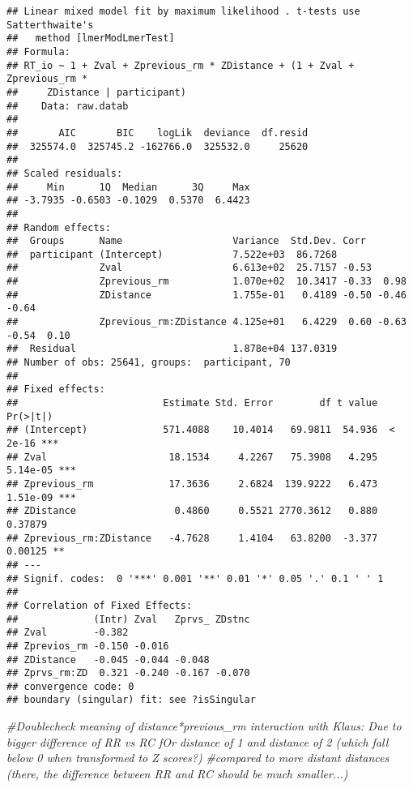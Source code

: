 \documentclass[
]{article}
\newenvironment{Shaded}{\begin{snugshade}}{\end{snugshade}}
\newcommand{\CommentTok}[1]{\textcolor[rgb]{0.56,0.35,0.01}{\textit{#1}}}
\begin{document}
\begin{verbatim}
## Linear mixed model fit by maximum likelihood . t-tests use Satterthwaite's
##   method [lmerModLmerTest]
## Formula: 
## RT_io ~ 1 + Zval + Zprevious_rm * ZDistance + (1 + Zval + Zprevious_rm *  
##     ZDistance | participant)
##    Data: raw.datab
## 
##       AIC       BIC    logLik  deviance  df.resid 
##  325574.0  325745.2 -162766.0  325532.0     25620 
## 
## Scaled residuals: 
##     Min      1Q  Median      3Q     Max 
## -3.7935 -0.6503 -0.1029  0.5370  6.4423 
## 
## Random effects:
##  Groups      Name                   Variance  Std.Dev. Corr                   
##  participant (Intercept)            7.522e+03  86.7268                        
##              Zval                   6.613e+02  25.7157 -0.53                  
##              Zprevious_rm           1.070e+02  10.3417 -0.33  0.98            
##              ZDistance              1.755e-01   0.4189 -0.50 -0.46 -0.64      
##              Zprevious_rm:ZDistance 4.125e+01   6.4229  0.60 -0.63 -0.54  0.10
##  Residual                           1.878e+04 137.0319                        
## Number of obs: 25641, groups:  participant, 70
## 
## Fixed effects:
##                         Estimate Std. Error        df t value Pr(>|t|)    
## (Intercept)             571.4088    10.4014   69.9811  54.936  < 2e-16 ***
## Zval                     18.1534     4.2267   75.3908   4.295 5.14e-05 ***
## Zprevious_rm             17.3636     2.6824  139.9222   6.473 1.51e-09 ***
## ZDistance                 0.4860     0.5521 2770.3612   0.880  0.37879    
## Zprevious_rm:ZDistance   -4.7628     1.4104   63.8200  -3.377  0.00125 ** 
## ---
## Signif. codes:  0 '***' 0.001 '**' 0.01 '*' 0.05 '.' 0.1 ' ' 1
## 
## Correlation of Fixed Effects:
##             (Intr) Zval   Zprvs_ ZDstnc
## Zval        -0.382                     
## Zprevios_rm -0.150 -0.016              
## ZDistance   -0.045 -0.044 -0.048       
## Zprvs_rm:ZD  0.321 -0.240 -0.167 -0.070
## convergence code: 0
## boundary (singular) fit: see ?isSingular
\end{verbatim}

\begin{Shaded}
\begin{Highlighting}[]
\CommentTok{#Doublecheck meaning of distance*previous_rm interaction with Klaus: Due to bigger difference of RR vs RC fOr distance of 1 and distance of 2 (which fall below 0 when transformed to Z scores?) }
\CommentTok{#compared to more distant distances (there, the difference between RR and RC should be much smaller...)}
\end{Highlighting}
\end{Shaded}
\end{document}
